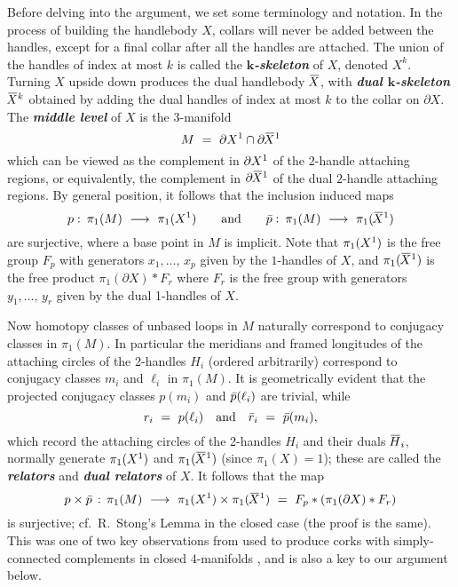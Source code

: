 \documentclass[11pt]{amsart}
\theoremstyle{definition}
\newcommand{\bit}[1]{\textbf{\textit{#1}}} %
\newcommand{\lfrom}{\ \longleftarrow \ }
\newcommand{\lto}{\ \longrightarrow \ }
\newcommand{\del}{\partial}
\begin{document}
Before delving into the argument, we set some terminology and notation.  In the process of building the handlebody $X$, collars will never be added between the handles, except for a final collar after all the handles are attached.  
The union of the handles of index at most $k$ is called the \bit{$\bm{k}$-skeleton} of $X$, denoted $X^{k}$.   Turning $X$ upside down produces the dual handlebody $\X$, with \bit{dual $\bm{k}$-skeleton} $\X^{k}$ obtained by adding the dual handles of index at most $k$ to the collar on $\del X$.  The \bit{middle level} of $X$ is the 3-manifold 
$$
M \ = \ \del\one\cap\del\dualone
$$ 
which can be viewed as the complement in $\del\one$ of the $2$-handle attaching regions, or equivalently, the complement in $\del\dualone$ of the dual $2$-handle attaching regions.  By general position, it follows that the inclusion induced maps 
$$
p\,\colon\,\pi_1(M) \lto \pi_1(\one)
\qquad\textup{and}\qquad
\dualp\,\colon\,\pi_1(M) \lto \pi_1(\dualone)
$$
are surjective, where a base point in $M$ is implicit.  Note that $\pi_1(X^{1})$ is the free group $F_p$ with generators $x_1,\dots,\,x_p$ given by the $1$-handles of $X$, and $\pi_1(\dualone)$ is the free product $\pi_1(\del X)*F_r$ where $F_r$ is the free group with generators $y_1,\dots,\,y_r$ given by the dual 1-handles of $X$.  

Now homotopy classes of unbased loops in $M$ naturally correspond to conjugacy classes in $\pi_1(M)$.
In particular the meridians and framed longitudes of the attaching circles of the 2-handles $H_i$ (ordered arbitrarily) correspond to conjugacy classes $m_i$ and $\ell_i$ in $\pi_1(M)$.  It is geometrically evident that the projected conjugacy classes $p(m_i)$ and $\bar p(\ell_i)$ are trivial, while 
$$
r_i \ = \ p(\ell_i)
\quad\text{and}\quad
\bar r_i \ = \ \bar p(m_i),
$$
which record the attaching circles of the 2-handles $H_i$ and their duals $\H_i$, normally generate $\pi_1(X^{1})$ and $\pi_1(\dualone)$ (since $\pi_1(X)=1$); these are called the \bit{relators} and \bit{dual relators} of $X$.  It follows that the map
$$
p \times \dualp \,:\,  \pi_1(M) \lto \pi_1(\one) \times \pi_1(\dualone) \ = \ F_p*(\pi_1(\del X)*F_r)
$$
is surjective; cf.\ R.\ Stong's Lemma \cite[p.\,500]{stong} in the closed case (the proof is the same).  This was one of two key observations from \cite{stong} used to produce corks with simply-connected complements in closed $4$-manifolds \cite{curtis-freedman-hsiang-stong}, and is also a key to our argument below.  
\end{document}
